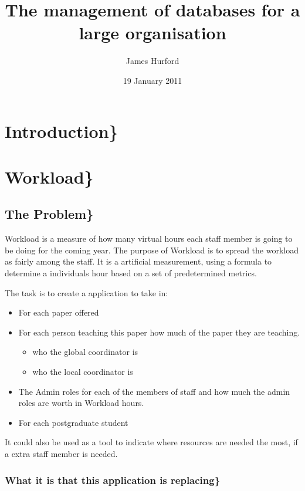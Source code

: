 \documentclass[11pt]{article}
\title{The management of databases for a large organisation}
\author{James Hurford}
\date{19 January 2011}
\begin{document}
\maketitle

\setcounter{tocdepth}{3}
\tableofcontents
\vspace*{1cm}

\section{Introduction\}}
\label{sec-1}
\section{Workload\}}
\label{sec-2}
\subsection{The Problem\}}
\label{sec-2_1}

Workload is a measure of how many virtual hours each staff member is
going to be doing for the coming year. The purpose of Workload is to
spread the workload as fairly among the staff.  It is a artificial
measurement, using a formula to determine a individuals hour based on
a set of predetermined metrics.

The task is to create a application to take in:


\begin{itemize}
\item For each paper offered
\item For each person teaching this paper how much of the paper they
  are teaching.

\begin{itemize}
\item who the global coordinator is
\item who the local coordinator is
\end{itemize}

\item The Admin roles for each of the members of staff and how much
  the admin roles are worth in Workload hours.
\item For each postgraduate student
\end{itemize}

It could also be used as a tool to indicate where resources are needed
the most, if a extra staff member is needed.
\subsubsection{What it is that this application is replacing\}}
\label{sec-2_1_1}
\end{document}
